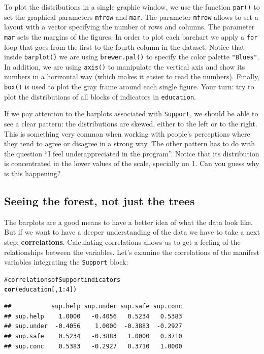 \documentclass[12pt]{book}\usepackage{graphicx, color}
\makeatletter
\newcommand{\hlfunctioncall}[1]{\textcolor[rgb]{0.501960784313725,0,0.329411764705882}{\textbf{#1}}}%
\newcommand{\hlcomment}[1]{\textcolor[rgb]{0.180392156862745,0.6,0.341176470588235}{#1}}%
\newenvironment{kframe}{%
 \def\at@end@of@kframe{}%
 \ifinner\ifhmode%
  \def\at@end@of@kframe{\end{minipage}}%
  \begin{minipage}{\columnwidth}%
 \fi\fi%
 \def\FrameCommand##1{\hskip\@totalleftmargin \hskip-\fboxsep
 \colorbox{shadecolor}{##1}\hskip-\fboxsep
     \hskip-\linewidth \hskip-\@totalleftmargin \hskip\columnwidth}%
 \MakeFramed {\advance\hsize-\width
   \@totalleftmargin\z@ \linewidth\hsize
   \@setminipage}}%
 {\par\unskip\endMakeFramed%
 \at@end@of@kframe}
\newenvironment{knitrout}{}{} %
\newcommand{\code}[1]{\texttt{#1}}
\makeatother
\begin{document}
To plot the distributions in a single graphic window, we use the function \code{par()} to set the graphical parameters \code{mfrow} and \code{mar}. The parameter \code{mfrow} allows to set a layout with a vector specifying the number of rows and columns. The parameter \code{mar} sets the margins of the figures. In order to plot each barchart we apply a \code{for} loop that goes from the first to the fourth column in the dataset. Notice that inside \code{barplot()} we are using \code{brewer.pal()} to specify the color palette \code{"Blues"}. In addition, we are using \code{axis()} to manipulate the vertical axis and show its numbers in a horizontal way (which makes it easier to read the numbers). Finally, \code{box()} is used to plot the gray frame around each single figure. Your turn: try to plot the distributions of all blocks of indicators in \code{education}.

If we pay attention to the barplots associated with \code{Support}, we should be able to see a clear pattern: the distributions are skewed, either to the left or to the right. This is something very common when working with people's perceptions where they tend to agree or disagree in a strong way. The other pattern has to do with the question ``I feel underappreciated in the program''. Notice that its distribution is concentrated in the lower values of the scale, specially on 1. Can you guess why is this happening?



\subsection{Seeing the forest, not just the trees}
The barplots are a good means to have a better idea of what the data look like. But if we want to have a deeper understanding of the data we have to take a next step: \textbf{correlations}. Calculating correlations allows us to get a feeling of the relationships between the variables. Let's examine the correlations of the manifest variables integrating the \code{Support} block:
\begin{knitrout}
\color{fgcolor}\begin{kframe}
\begin{alltt}
\hlcomment{# correlations of Support indicators}
\hlfunctioncall{cor}(education[, 1:4])
\end{alltt}
\begin{verbatim}
##           sup.help sup.under sup.safe sup.conc
## sup.help    1.0000   -0.4056   0.5234   0.5383
## sup.under  -0.4056    1.0000  -0.3883  -0.2927
## sup.safe    0.5234   -0.3883   1.0000   0.3710
## sup.conc    0.5383   -0.2927   0.3710   1.0000
\end{verbatim}
\end{kframe}
\end{knitrout}
\end{document}
